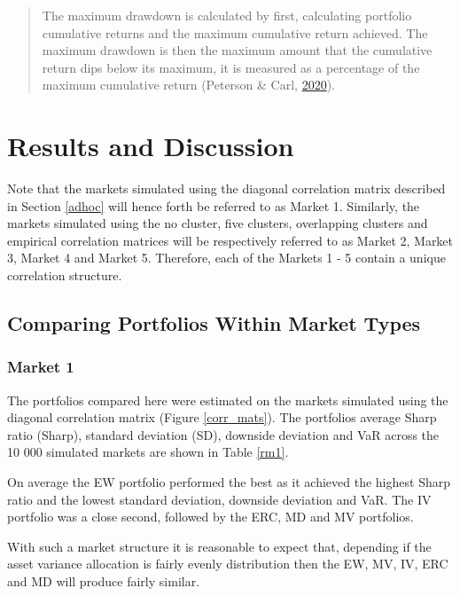 \documentclass[11pt,preprint, authoryear]{elsarticle}
\numberwithin{equation}{section}
\numberwithin{figure}{section}
\numberwithin{table}{section}
\begin{document}
\begin{quote}
The maximum drawdown is calculated by first, calculating portfolio
cumulative returns and the maximum cumulative return achieved. The
maximum drawdown is then the maximum amount that the cumulative return
dips below its maximum, it is measured as a percentage of the maximum
cumulative return (Peterson \& Carl,
\protect\hyperlink{ref-PerformanceAnalytics}{2020}).
\end{quote}

\hypertarget{results-and-discussion}{%
\section{\texorpdfstring{Results and Discussion
\label{reasults}}{Results and Discussion }}\label{results-and-discussion}}

Note that the markets simulated using the diagonal correlation matrix
described in Section \ref{adhoc} will hence forth be referred to as
Market 1. Similarly, the markets simulated using the no cluster, five
clusters, overlapping clusters and empirical correlation matrices will
be respectively referred to as Market 2, Market 3, Market 4 and Market
5. Therefore, each of the Markets 1 - 5 contain a unique correlation
structure.

\hypertarget{comparing-portfolios-within-market-types}{%
\subsection{Comparing Portfolios Within Market
Types}\label{comparing-portfolios-within-market-types}}

\hypertarget{market-1}{%
\subsubsection{Market 1}\label{market-1}}

The portfolios compared here were estimated on the markets simulated
using the diagonal correlation matrix (Figure \ref{corr_mats}). The
portfolios average Sharp ratio (Sharp), standard deviation (SD),
downside deviation and VaR across the 10 000 simulated markets are shown
in Table \ref{rm1}.

On average the EW portfolio performed the best as it achieved the
highest Sharp ratio and the lowest standard deviation, downside
deviation and VaR. The IV portfolio was a close second, followed by the
ERC, MD and MV portfolios.

With such a market structure it is reasonable to expect that, depending
if the asset variance allocation is fairly evenly distribution then the
EW, MV, IV, ERC and MD will produce fairly similar.
\end{document}
